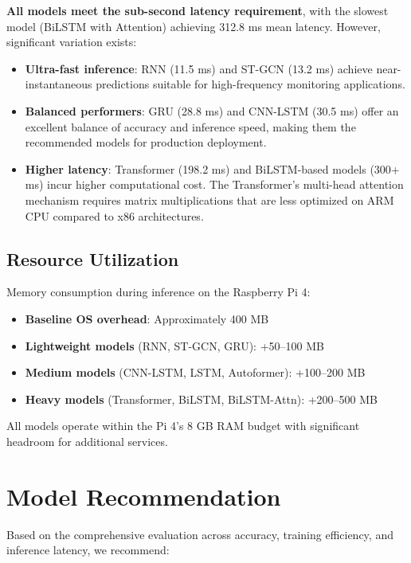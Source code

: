 \textbf{All models meet the sub-second latency requirement}, with the slowest model (BiLSTM with Attention) achieving 312.8 ms mean latency. However, significant variation exists:

\begin{itemize}
    \item \textbf{Ultra-fast inference}: RNN (11.5 ms) and ST-GCN (13.2 ms) achieve near-instantaneous predictions suitable for high-frequency monitoring applications.
    
    \item \textbf{Balanced performers}: GRU (28.8 ms) and CNN-LSTM (30.5 ms) offer an excellent balance of accuracy and inference speed, making them the recommended models for production deployment.
    
    \item \textbf{Higher latency}: Transformer (198.2 ms) and BiLSTM-based models (300+ ms) incur higher computational cost. The Transformer's multi-head attention mechanism requires matrix multiplications that are less optimized on ARM CPU compared to x86 architectures.
\end{itemize}

\subsection{Resource Utilization}

Memory consumption during inference on the Raspberry Pi 4:

\begin{itemize}
    \item \textbf{Baseline OS overhead}: Approximately 400 MB
    \item \textbf{Lightweight models} (RNN, ST-GCN, GRU): +50--100 MB
    \item \textbf{Medium models} (CNN-LSTM, LSTM, Autoformer): +100--200 MB
    \item \textbf{Heavy models} (Transformer, BiLSTM, BiLSTM-Attn): +200--500 MB
\end{itemize}

All models operate within the Pi 4's 8 GB RAM budget with significant headroom for additional services.

\section{Model Recommendation}

Based on the comprehensive evaluation across accuracy, training efficiency, and inference latency, we recommend:


